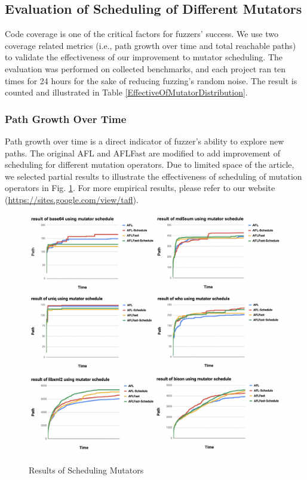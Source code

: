 \subsection{Evaluation of Scheduling of Different Mutators}
Code coverage is one of the critical factors for fuzzers' success. 
We use two coverage related metrics (i.e., path growth over time and total reachable paths) to validate the effectiveness of our improvement to mutator scheduling. The evaluation was performed on collected benchmarks, and each project ran ten times for 24 hours for the sake of reducing fuzzing's random noise. The result is counted and illustrated in Table \ref{EffectiveOfMutatorDistribution}.

\subsubsection{Path Growth Over Time}
Path growth over time is a direct indicator of fuzzer's ability to explore new paths. The original AFL and AFLFast are modified to add improvement of scheduling for different mutation operators. Due to limited space of the article, we selected partial results to illustrate the effectiveness of scheduling of mutation operators in Fig. \ref{mutateSchedule}. For more empirical results, please refer to our website (\url{https://sites.google.com/view/tafl}).

\begin{figure}[t]
    \centering
    \includegraphics[width=\columnwidth]{pic/scheduleLAVM12.png}
    \includegraphics[width=\columnwidth]{pic/schedule22.png}
    \caption{Results of Scheduling Mutators}
    \label{mutateSchedule}
\end{figure}

